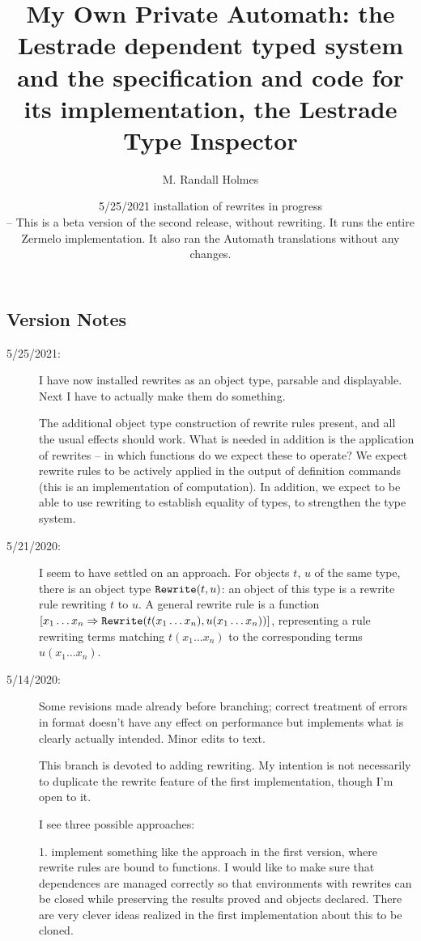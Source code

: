 \documentclass[12pt]{article}
\title{My Own Private Automath:  the Lestrade dependent typed system and the specification and code for its implementation, the Lestrade Type Inspector}
\author{M. Randall Holmes}
\date{5/25/2021  installation of rewrites in progress \\

 -- This is a beta version of the second release, without rewriting.  It runs the entire  Zermelo implementation. It also ran the Automath translations without any changes.}
\begin{document}
\maketitle

\tableofcontents

\newpage

\subsection{Version Notes}

\begin{description}

\item[5/25/2021:]  I have now installed rewrites as an object type, parsable and displayable.  Next I have to actually make them do something.

The additional object type construction of rewrite rules present, and all the usual effects should work.  What is needed in addition is the application of rewrites -- in which functions
do we expect these to operate?  We expect rewrite rules to be actively applied in the output of definition commands (this is an implementation of computation).
In addition, we expect to be able to use rewriting to establish equality of types, to strengthen the type system.

\item[5/21/2020:]  I seem to have settled on an approach.  For objects $t$, $u$ of the same type, there is an object type ${\tt Rewrite}(t,u)$:  an object of this
type is a rewrite rule rewriting $t$ to $u$.  A general rewrite rule is a function $[x_1 \ldots x_n \Rightarrow {\tt Rewrite}(t(x_1\ldots x_n),u(x_1\ldots x_n))]$, representing
a rule rewriting terms matching $t(x_1\ldots x_n)$ to the corresponding terms $u(x_1\ldots x_n)$.

\item[5/14/2020:]  Some revisions made already before branching;  correct treatment of errors in format doesn't have any effect on performance
but implements what is clearly actually intended.  Minor edits to text.

This branch is devoted to adding rewriting.  My intention is not necessarily to duplicate the rewrite feature of the first implementation, though I'm open to it.

I see three possible approaches:

1.  implement something like the approach in the first version, where rewrite rules are bound to functions.  I would like to make sure that dependences
are managed correctly so that environments with rewrites can be closed while preserving the results proved and objects declared.  There are very clever
ideas realized in the first implementation about this to be cloned.


\end{description}
\end{document}
